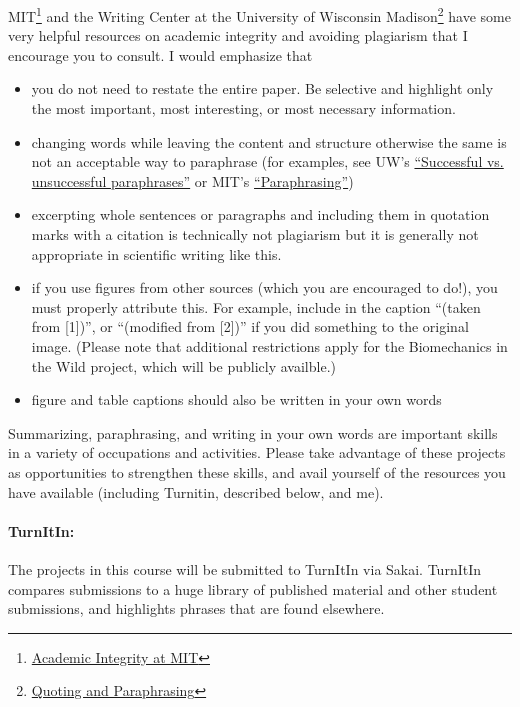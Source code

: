 \documentclass[11pt]{article}
\begin{document}
MIT\footnote{\href{https://integrity.mit.edu/}{Academic Integrity at MIT}} and the Writing Center at the University of Wisconsin Madison\footnote{\href{https://writing.wisc.edu/Handbook/QuotingSources.html}{Quoting and Paraphrasing}} have some very helpful resources on academic integrity and avoiding plagiarism that I encourage you to consult.  I would emphasize that 
\begin{itemize}
\item you do not need to restate the entire paper. Be selective and highlight only the most important, most interesting, or most necessary information.  
\item changing words while leaving the content and structure otherwise the same is not an acceptable way to paraphrase (for examples, see UW's \href{https://writing.wisc.edu/Handbook/QPA/QPA_paraphrase.html}{ ``Successful vs. unsuccessful paraphrases''} or MIT's \href{https://integrity.mit.edu/handbook/academic-writing/avoiding-plagiarism-paraphrasing}{``Paraphrasing''})
\item excerpting whole sentences or paragraphs and including them in quotation marks with a citation is technically not plagiarism but it is generally not appropriate in scientific writing like this.
\item if you use figures from other sources (which you are encouraged to do!), you must properly attribute this.  For example, include in the caption ``(taken from [1])'', or ``(modified from [2])'' if you did something to the original image.  (Please note that additional restrictions apply for the Biomechanics in the Wild project, which will be publicly availble.)
\item figure and table captions should also be written in your own words
\end{itemize}

Summarizing, paraphrasing, and writing in your own words are important skills in a variety of occupations and activities.  Please take advantage of these projects as opportunities to strengthen these skills, and avail yourself of the resources you have available (including Turnitin, described below, and me).

\paragraph{TurnItIn:}
The projects in this course will be submitted to TurnItIn via Sakai.  TurnItIn compares submissions to a huge library of published material and other student submissions, and highlights phrases that are found elsewhere.
\end{document}
